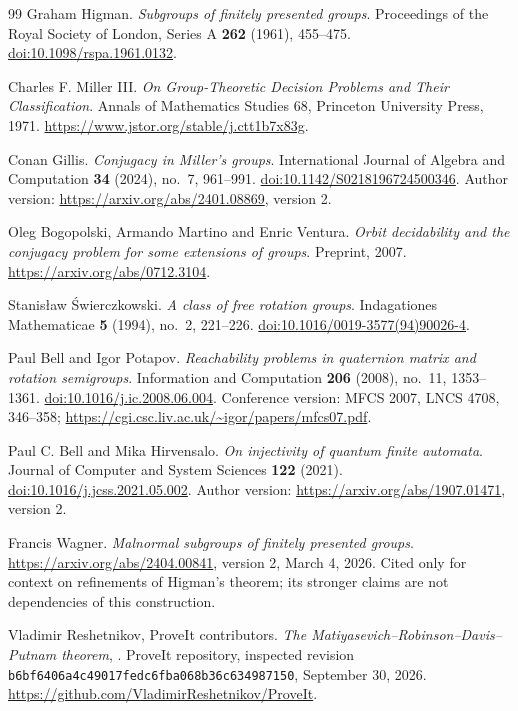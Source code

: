 \documentclass[11pt,letterpaper]{article}
\numberwithin{equation}{section}
\theoremstyle{definition}
\theoremstyle{remark}
\newcommand{\code}[1]{\nolinkurl{#1}}
\newcommand{\repourl}{\url{https://github.com/VladimirReshetnikov/ProveIt}}
\begin{document}
\begin{thebibliography}{99}
Graham Higman.
\emph{Subgroups of finitely presented groups}.
Proceedings of the Royal Society of London, Series A \textbf{262}
(1961), 455--475.
\href{https://doi.org/10.1098/rspa.1961.0132}{doi:10.1098/rspa.1961.0132}.

Charles F. Miller III.
\emph{On Group-Theoretic Decision Problems and Their Classification}.
Annals of Mathematics Studies 68, Princeton University Press, 1971.
\url{https://www.jstor.org/stable/j.ctt1b7x83g}.

Conan Gillis.
\emph{Conjugacy in Miller's groups}.
International Journal of Algebra and Computation \textbf{34} (2024),
no.~7, 961--991.
\href{https://doi.org/10.1142/S0218196724500346}{doi:10.1142/S0218196724500346}.
Author version: \url{https://arxiv.org/abs/2401.08869}, version 2.

Oleg Bogopolski, Armando Martino and Enric Ventura.
\emph{Orbit decidability and the conjugacy problem for some extensions
of groups}.
Preprint, 2007. \url{https://arxiv.org/abs/0712.3104}.

Stanis\l aw \'{S}wierczkowski.
\emph{A class of free rotation groups}.
Indagationes Mathematicae \textbf{5} (1994), no.~2, 221--226.
\href{https://doi.org/10.1016/0019-3577(94)90026-4}{doi:10.1016/0019-3577(94)90026-4}.

Paul Bell and Igor Potapov.
\emph{Reachability problems in quaternion matrix and rotation semigroups}.
Information and Computation \textbf{206} (2008), no.~11, 1353--1361.
\href{https://doi.org/10.1016/j.ic.2008.06.004}{doi:10.1016/j.ic.2008.06.004}.
Conference version: MFCS 2007, LNCS 4708, 346--358;
\url{https://cgi.csc.liv.ac.uk/~igor/papers/mfcs07.pdf}.

Paul C. Bell and Mika Hirvensalo.
\emph{On injectivity of quantum finite automata}.
Journal of Computer and System Sciences \textbf{122} (2021).
\href{https://doi.org/10.1016/j.jcss.2021.05.002}{doi:10.1016/j.jcss.2021.05.002}.
Author version: \url{https://arxiv.org/abs/1907.01471}, version 2.

Francis Wagner.
\emph{Malnormal subgroups of finitely presented groups}.
\url{https://arxiv.org/abs/2404.00841}, version 2, March 4, 2026.
Cited only for context on refinements of Higman's theorem; its stronger
claims are not dependencies of this construction.

Vladimir Reshetnikov, ProveIt contributors.
\emph{The Matiyasevich--Robinson--Davis--Putnam theorem},
.
ProveIt repository, inspected revision
\code{b6bf6406a4c49017fedc6fba068b36c634987150}, September 30, 2026.
\repourl.


\end{thebibliography}
\end{document}
